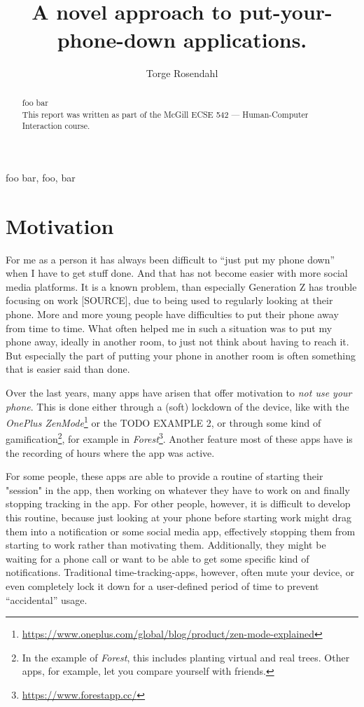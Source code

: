 \documentclass[conference]{IEEEtran}
\title{\projectname\\\Large{A novel approach to put-your-phone-down applications.}}
\author{Torge Rosendahl}
\begin{document}
\maketitle

\begin{abstract}
foo bar
\\
This report was written as part of the McGill ECSE 542 --- Human-Computer Interaction course.
\end{abstract}

\begin{IEEEkeywords}
foo bar, foo, bar
\end{IEEEkeywords}

\section{Motivation}
For me as a person it has always been difficult to ``just put my phone down'' when I have to get stuff done. And that has not become easier with more social media platforms. It is a known problem, than especially Generation Z has trouble focusing on work [SOURCE], due to being used to regularly looking at their phone. More and more young people have difficulties to put their phone away from time to time. What often helped me in such a situation was to put my phone away, ideally in another room, to just not think about having to reach it. But especially the part of putting your phone in another room is often something that is easier said than done.

Over the last years, many apps have arisen that offer motivation to \textit{not use your phone}. This is done either through a (soft) lockdown of the device, like with the \textit{OnePlus ZenMode}\footnote{\url{https://www.oneplus.com/global/blog/product/zen-mode-explained}} or the TODO EXAMPLE 2, or through some kind of gamification\footnote{In the example of \textit{Forest}, this includes planting virtual and real trees. Other apps, for example, let you compare yourself with friends.}, for example in \textit{Forest}\footnote{\url{https://www.forestapp.cc/}}. Another feature most of these apps have is the recording of hours where the app was active.

For some people, these apps are able to provide a routine of starting their "session" in the app, then working on whatever they have to work on and finally stopping tracking in the app. For other people, however, it is difficult to develop this routine, because just looking at your phone before starting work might drag them into a notification or some social media app, effectively stopping them from starting to work rather than motivating them. Additionally, they might be waiting for a phone call or want to be able to get some specific kind of notifications. Traditional time-tracking-apps, however, often mute your device, or even completely lock it down for a user-defined period of time to prevent ``accidental'' usage.
\end{document}
